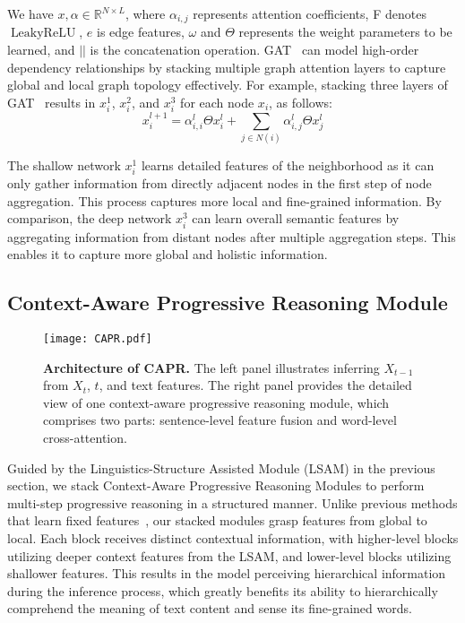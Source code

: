 \documentclass[10pt,twocolumn,letterpaper]{article}
\begin{document}
We have $x, \alpha \in \mathbb{R}^{N \times L}$, where $\alpha_{i, j}$ represents attention coefficients, F denotes $\operatorname{LeakyReLU}$, $e$ is edge features, $\omega$ and $\Theta$ represents the weight parameters to be learned, and $||$ is the concatenation operation. GAT~\cite{velivckovic2017graph} can model high-order dependency relationships by stacking multiple graph attention layers to capture global and local graph topology effectively. For example, stacking three layers of GAT~\cite{velivckovic2017graph} results in $x_i^1$, $x_i^2$, and $x_i^3$ for each node $x_i$, as follows:
\begin{equation}
{x}_{i}^{l+1}=\alpha_{i, i}^{l}  \Theta {x}_{i}^{l} + \sum_{j \in N(i)} \alpha_{i, j}^{l} \Theta {x}_{j}^{l} 
\end{equation}



The shallow network $x_i^1$ learns detailed features of the neighborhood as it can only gather information from directly adjacent nodes in the first step of node aggregation. This process captures more local and fine-grained information. By comparison, the deep network $x_i^3$ can learn overall semantic features by aggregating information from distant nodes after multiple aggregation steps. This enables it to capture more global and holistic information.


\subsection{Context-Aware Progressive Reasoning Module}
\label{sec:CAPR}
\begin{figure}[t]
  \centering
  \texttt{[image: CAPR.pdf]}
  \caption{\textbf{Architecture of CAPR.} The left panel illustrates inferring $X_{t-1}$ from $X_t$, $t$, and text features. The right panel provides the detailed view of one context-aware progressive reasoning module, which comprises two parts: sentence-level feature fusion and word-level cross-attention.}
  \label{fig:CAPR}
\end{figure}



Guided by the Linguistics-Structure Assisted Module (LSAM) in the previous section, we stack Context-Aware Progressive Reasoning Modules to perform multi-step progressive reasoning in a structured manner. Unlike previous methods that learn fixed features~\cite{tevet2022human,zhang2022motiondiffuse}, our stacked modules grasp features from global to local. Each block receives distinct contextual information, with higher-level blocks utilizing deeper context features from the LSAM, and lower-level blocks utilizing shallower features. This results in the model perceiving hierarchical information during the inference process, which greatly benefits its ability to hierarchically comprehend the meaning of text content and sense its fine-grained words. 
\end{document}
